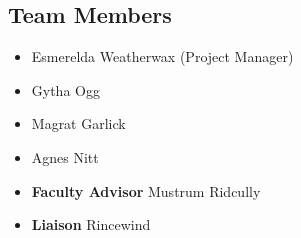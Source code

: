 \documentclass[clinic]{hmcposter}
\begin{document}
\begin{poster}
\subsection{Team Members}

\begin{multicols}{2}
\setlength{\columnseprule}{0pt}
\begin{itemize}
\item Esmerelda Weatherwax (Project Manager)
\item Gytha Ogg
\item Magrat Garlick
\item Agnes Nitt
\item \textbf{Faculty Advisor} Mustrum Ridcully
\item \textbf{Liaison} Rincewind
\end{itemize}
\end{multicols}


\vfill


\end{poster}
\end{document}
